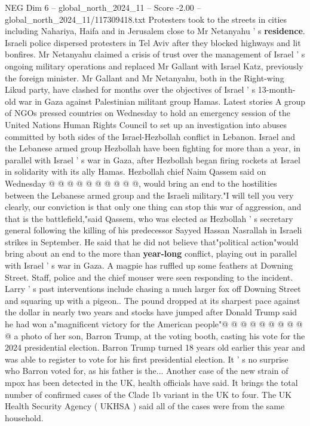 \begin{textsample}{NEG Dim 6 – global\_north\_2024\_11 – Score -2.00 – global\_north\_2024\_11/117309418.txt}  \label{ex:f6_neg_097}
Protesters took to the streets in cities including Nahariya, Haifa and in Jerusalem close to Mr Netanyahu ' s \textbf{residence}.
Israeli police dispersed protesters in Tel Aviv after they blocked highways and lit bonfires.
Mr Netanyahu claimed a crisis of trust over the management of Israel ' s ongoing military operations and replaced Mr Gallant with Israel Katz, previously the foreign minister.
Mr Gallant and Mr Netanyahu, both in the Right-wing Likud party, have clashed for months over the objectives of Israel ' s 13-month-old war in Gaza against Palestinian militant group Hamas.
Latest stories A group of NGOs pressed countries on Wednesday to hold an emergency session of the United Nations Human Rights Council to set up an investigation into abuses committed by both sides of the Israel-Hezbollah conflict in Lebanon.
Israel and the Lebanese armed group Hezbollah have been fighting for more than a year, in parallel with Israel ' s war in Gaza, after Hezbollah began firing rockets at Israel in solidarity with its ally Hamas.
Hezbollah chief Naim Qassem said on Wednesday @ @ @ @ @ @ @ @ @ @, would bring an end to the hostilities between the Lebanese armed group and the Israeli military."I will tell you very clearly, our conviction is that only one thing can stop this war of aggression, and that is the battlefield,"said Qassem, who was elected as Hezbollah ' s secretary general following the killing of his predecessor Sayyed Hassan Nasrallah in Israeli strikes in September.
He said that he did not believe that"political action"would bring about an end to the more than \textbf{year-long} conflict, playing out in parallel with Israel ' s war in Gaza.
A magpie has ruffled up some feathers at Downing Street.
Staff, police and the chief mouser were seen responding to the incident.
Larry ' s past interventions include chasing a much larger fox off Downing Street and squaring up with a pigeon..
The pound dropped at its sharpest pace against the dollar in nearly two years and stocks have jumped after Donald Trump said he had won a"magnificent victory for the American people"@ @ @ @ @ @ @ @ @ @ a photo of her son, Barron Trump, at the voting booth, casting his vote for the 2024 presidential election.
Barron Trump turned 18 years old earlier this year and was able to register to vote for his first presidential election.
It ' s no surprise who Barron voted for, as his father is the...
Another case of the new strain of mpox has been detected in the UK, health officials have said.
It brings the total number of confirmed cases of the Clade 1b variant in the UK to four.
The UK Health Security Agency ( UKHSA ) said all of the cases were from the same household.

\end{textsample}
